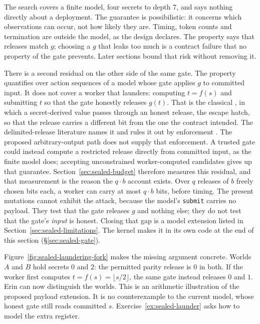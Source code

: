 \documentclass[11pt,a4paper]{article}
\theoremstyle{definition}
\begin{document}
\begin{pdboundary}
\setlength{\parskip}{4pt plus 1pt}
The search covers a finite model, four secrets to depth 7, and says nothing
directly about a deployment. The guarantee is possibilistic: it concerns which
observations can occur, not how likely they are. Timing, token counts and
termination are outside the model, as the design declares. The property says
that releases match $g$; choosing a $g$ that leaks too much is a contract
failure that no property of the gate prevents. Later sections bound that risk
without removing it.

There is a second residual on the other side of the same gate. The property
quantifies over action sequences of a model whose gate applies $g$ to committed
input. It does not cover a worker that launders: computing $t=f(s)$ and
submitting $t$ so that the gate honestly releases $g(t)$. That is the classical
, in which a secret-derived value passes through an
honest release, the escape hatch, so that the release carries a different bit from the one the
contract intended. The delimited-release literature names it and rules it out
by enforcement . The proposed arbitrary-output path does not
supply that enforcement. A trusted gate could instead compute a restricted
release directly from committed input, as the finite model does; accepting
unconstrained worker-computed candidates gives up that guarantee.
Section~\ref{sec:sealed-budget} therefore measures this residual, and that
measurement is the reason the $q\cdot b$ account exists. Over $q$ releases of
$b$ freely chosen bits each, a worker can carry at most $q\cdot b$ bits,
before timing. The present
mutations cannot exhibit the attack, because the model's \texttt{submit}
carries no payload. They test that the gate releases $g$ and nothing else;
they do not test that the gate's \emph{input} is honest. Closing that gap is
a model extension listed in Section~\ref{sec:sealed-limitations}. The kernel
makes it in its own code at the end of this section
(\S\ref{sec:sealed-gate}).
\end{pdboundary}

Figure~\ref{fig:sealed-laundering-fork} makes the missing argument concrete.
Worlds $A$ and $B$ hold secrets $0$ and $2$: the permitted parity release is
$0$ in both. If the worker first computes $t=f(s)=\lfloor s/2\rfloor$, the
same gate instead releases $0$ and $1$. Erin can now distinguish the worlds.
This is an arithmetic illustration of the proposed payload extension. It is
no counterexample to the current model, whose honest gate still reads
committed $s$. Exercise~\ref{ex:sealed-launder} asks how to model the extra register.
\end{document}
